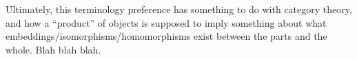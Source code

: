 \documentclass[11pt, oneside]{amsart}
\begin{document}
\begin{remark}
  Ultimately, this terminology preference has something to do with
  category theory, and how a ``product'' of objects is supposed to imply
  something about what embeddings/isomorphisms/homomorphisms exist
  between the parts and the whole. Blah blah blah.
\end{remark}

%
%
%
\end{document}
